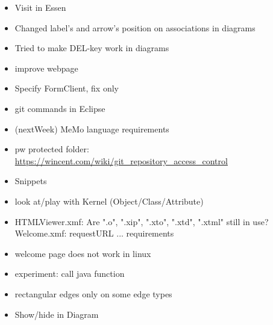 \begin{itemize} 
\item Visit in Essen
\end{itemize}

\begin{itemize} 
\item Changed label's and arrow's position on associations in diagrams
\item Tried to make DEL-key work in diagrams
\end{itemize}

\begin{itemize}
\item improve webpage
\item Specify FormClient, fix only
\item git commands in Eclipse
\item (nextWeek) MeMo language requirements
\item pw protected folder: \url{https://wincent.com/wiki/git_repository_access_control}
\item Snippets
\item look at/play with Kernel (Object/Class/Attribute)
\item HTMLViewer.xmf: Are ".o", ".xip", ".xto", ".xtd", ".xtml" still in use?
Welcome.xmf: requestURL ...
requirements
\item welcome page does not work in linux
\item experiment: call java function
\item rectangular edges only on some edge types
\item Show/hide in Diagram

\end{itemize}
